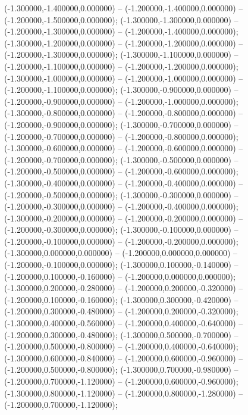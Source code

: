  (-1.300000,-1.400000,0.000000) -- (-1.200000,-1.400000,0.000000) -- (-1.200000,-1.500000,0.000000);
 (-1.300000,-1.300000,0.000000) -- (-1.200000,-1.300000,0.000000) -- (-1.200000,-1.400000,0.000000);
 (-1.300000,-1.200000,0.000000) -- (-1.200000,-1.200000,0.000000) -- (-1.200000,-1.300000,0.000000);
 (-1.300000,-1.100000,0.000000) -- (-1.200000,-1.100000,0.000000) -- (-1.200000,-1.200000,0.000000);
 (-1.300000,-1.000000,0.000000) -- (-1.200000,-1.000000,0.000000) -- (-1.200000,-1.100000,0.000000);
 (-1.300000,-0.900000,0.000000) -- (-1.200000,-0.900000,0.000000) -- (-1.200000,-1.000000,0.000000);
 (-1.300000,-0.800000,0.000000) -- (-1.200000,-0.800000,0.000000) -- (-1.200000,-0.900000,0.000000);
 (-1.300000,-0.700000,0.000000) -- (-1.200000,-0.700000,0.000000) -- (-1.200000,-0.800000,0.000000);
 (-1.300000,-0.600000,0.000000) -- (-1.200000,-0.600000,0.000000) -- (-1.200000,-0.700000,0.000000);
 (-1.300000,-0.500000,0.000000) -- (-1.200000,-0.500000,0.000000) -- (-1.200000,-0.600000,0.000000);
 (-1.300000,-0.400000,0.000000) -- (-1.200000,-0.400000,0.000000) -- (-1.200000,-0.500000,0.000000);
 (-1.300000,-0.300000,0.000000) -- (-1.200000,-0.300000,0.000000) -- (-1.200000,-0.400000,0.000000);
 (-1.300000,-0.200000,0.000000) -- (-1.200000,-0.200000,0.000000) -- (-1.200000,-0.300000,0.000000);
 (-1.300000,-0.100000,0.000000) -- (-1.200000,-0.100000,0.000000) -- (-1.200000,-0.200000,0.000000);
 (-1.300000,0.000000,0.000000) -- (-1.200000,0.000000,0.000000) -- (-1.200000,-0.100000,0.000000);
 (-1.300000,0.100000,-0.140000) -- (-1.200000,0.100000,-0.160000) -- (-1.200000,0.000000,0.000000);
 (-1.300000,0.200000,-0.280000) -- (-1.200000,0.200000,-0.320000) -- (-1.200000,0.100000,-0.160000);
 (-1.300000,0.300000,-0.420000) -- (-1.200000,0.300000,-0.480000) -- (-1.200000,0.200000,-0.320000);
 (-1.300000,0.400000,-0.560000) -- (-1.200000,0.400000,-0.640000) -- (-1.200000,0.300000,-0.480000);
 (-1.300000,0.500000,-0.700000) -- (-1.200000,0.500000,-0.800000) -- (-1.200000,0.400000,-0.640000);
 (-1.300000,0.600000,-0.840000) -- (-1.200000,0.600000,-0.960000) -- (-1.200000,0.500000,-0.800000);
 (-1.300000,0.700000,-0.980000) -- (-1.200000,0.700000,-1.120000) -- (-1.200000,0.600000,-0.960000);
 (-1.300000,0.800000,-1.120000) -- (-1.200000,0.800000,-1.280000) -- (-1.200000,0.700000,-1.120000);
